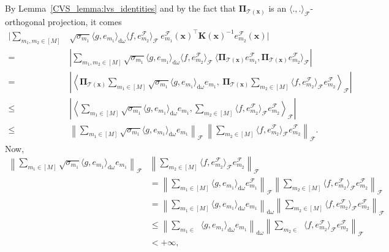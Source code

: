 \documentclass[twoside,11pt]{book}
\numberwithin{theorem}{chapter}
\numberwithin{definition}{chapter}
\numberwithin{proposition}{chapter}
\numberwithin{corollary}{chapter}
\numberwithin{example}{chapter}
\numberwithin{lemma}{chapter}
\numberwithin{assumption}{chapter}
\numberwithin{equation}{chapter}
\numberwithin{figure}{chapter}
\DeclareMathOperator{\Tran}{\intercal}
\DeclareMathOperator{\F}{\mathcal{F}}
\DeclareMathOperator{\Ns}{\mathbb{N}^{*}}
\begin{document}
By Lemma~\ref{CVS_lemma:lvs_identities} and by the fact that $\bm{\Pi}_{\mathcal{T}(\bm{x})}$ is an $\langle.,.\rangle_{\F}$-orthogonal projection, it comes
\begin{align}
\Bigg|\sum_{m_{1}, m_2 \in [M]} &\sqrt{\sigma_{m_{1}}} \langle g, e_{m_{1}} \rangle_{\mathrm{d}\omega} \langle f, e_{m_{2}}^{\F} \rangle_{\F}  \: e_{m_{1}}^{\F}(\bm{x})^{\Tran} \bm{K}(\bm{x})^{-1}e_{m_{2}}^{\F}(\bm{x}) \Bigg| \\
= & \left|\sum_{m_{1}, m_2 \in [M]} \sqrt{\sigma_{m_{1}}} \langle g, e_{m_{1}} \rangle_{\mathrm{d}\omega}  \langle f, e_{m_{2}}^{\F} \rangle_{\F}  \: \langle \bm{\Pi}_{\mathcal{T}(\bm{x})}e_{m_{1}}^{\F}, \bm{\Pi}_{\mathcal{T}(\bm{x})}e_{m_{2}}^{\F} \rangle_{\F} \right|\\
= & \left| \left\langle \bm{\Pi}_{\mathcal{T}(\bm{x})} \sum\limits_{m_{1} \in [M] }  \sqrt{\sigma_{m_{1}}} \langle g, e_{m_{1}} \rangle_{\mathrm{d}\omega}   e_{m_{1}},\:  \bm{\Pi}_{\mathcal{T}(\bm{x})} \sum\limits_{m_{2} \in [M]} \langle f, e_{m_{2}}^{\F} \rangle_{\F} e_{m_{2}}^{\F} \right\rangle_{\F} \right|\\
\leq & \left| \left\langle \sum\limits_{m_{1} \in [M] }  \sqrt{\sigma_{m_{1}}} \langle g, e_{m_{1}} \rangle_{\mathrm{d}\omega}   e_{m_{1}},  \sum\limits_{m_{2} \in [M]} \langle f, e_{m_{2}}^{\F} \rangle_{\F} e_{m_{2}}^{\F} \right\rangle_{\F} \right|\\
\leq & \left\| \sum\limits_{m_{1} \in [M] }  \sqrt{\sigma_{m_{1}}} \langle g, e_{m_{1}} \rangle_{\mathrm{d}\omega}   e_{m_{1}} \right\|_{\F}\: \left \| \sum\limits_{m_{2} \in [M]} \langle f, e_{m_{2}}^{\F} \rangle_{\F} e_{m_{2}}^{\F} \right\|_{\F}.
\end{align}
Now,
\begin{align}
\left\| \sum\limits_{m_{1} \in [M] }  \sqrt{\sigma_{m_{1}}} \langle g, e_{m_{1}} \rangle_{\mathrm{d}\omega}   e_{m_{1}} \right\|_{\F}  & \left \| \sum\limits_{m_{2} \in [M]} \langle f, e_{m_{2}}^{\F} \rangle_{\F} e_{m_{2}}^{\F} \right\|_{\F}\\
&  = \left\| \sum\limits_{m_{1} \in [M] }  \langle g, e_{m_{1}} \rangle_{\mathrm{d}\omega}   e_{m_{1}}^{\F} \right\|_{\F} \left \| \sum\limits_{m_{2} \in [M]} \langle f, e_{m_{2}}^{\F} \rangle_{\F} e_{m_{2}}^{\F} \right\|_{\F}\\
&  = \left\| \sum\limits_{m_{1} \in [M] }  \langle g, e_{m_{1}} \rangle_{\mathrm{d}\omega}   e_{m_{1}} \right\|_{\mathrm{d}\omega} \left \| \sum\limits_{m_{2} \in [M]} \langle f, e_{m_{2}}^{\F} \rangle_{\F} e_{m_{2}}^{\F} \right\|_{\F}\\
&  \leq \left\| \sum\limits_{m_{1} \in \Ns }  \langle g, e_{m_{1}} \rangle_{\mathrm{d}\omega}   e_{m_{1}} \right\|_{\mathrm{d}\omega} \left \| \sum\limits_{m_{2} \in \Ns} \langle f, e_{m_{2}}^{\F} \rangle_{\F} e_{m_{2}}^{\F} \right\|_{\F}\\
& < +\infty,
\end{align}
\end{document}
